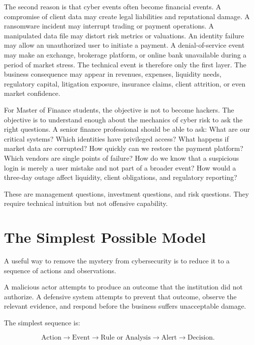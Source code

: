The second reason is that cyber events often become financial events. A compromise of client data may create legal liabilities and reputational damage. A ransomware incident may interrupt trading or payment operations. A manipulated data file may distort risk metrics or valuations. An identity failure may allow an unauthorized user to initiate a payment. A denial-of-service event may make an exchange, brokerage platform, or online bank unavailable during a period of market stress. The technical event is therefore only the first layer. The business consequence may appear in revenues, expenses, liquidity needs, regulatory capital, litigation exposure, insurance claims, client attrition, or even market confidence.

For Master of Finance students, the objective is not to become hackers. The objective is to understand enough about the mechanics of cyber risk to ask the right questions. A senior finance professional should be able to ask: What are our critical systems? Which identities have privileged access? What happens if market data are corrupted? How quickly can we restore the payment platform? Which vendors are single points of failure? How do we know that a suspicious login is merely a user mistake and not part of a broader event? How would a three-day outage affect liquidity, client obligations, and regulatory reporting?

These are management questions, investment questions, and risk questions. They require technical intuition but not offensive capability.

\section{The Simplest Possible Model}

A useful way to remove the mystery from cybersecurity is to reduce it to a sequence of actions and observations.

\begin{intuition}
A malicious actor attempts to produce an outcome that the institution did not authorize. A defensive system attempts to prevent that outcome, observe the relevant evidence, and respond before the business suffers unacceptable damage.
\end{intuition}

The simplest sequence is:

\begin{equation}
\text{Action}
\rightarrow
\text{Event}
\rightarrow
\text{Rule or Analysis}
\rightarrow
\text{Alert}
\rightarrow
\text{Decision}.
\end{equation}

